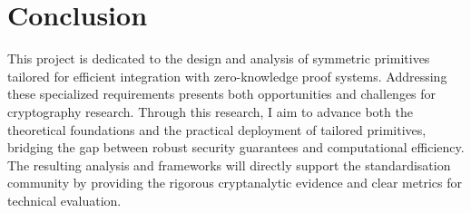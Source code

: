 	\section{Conclusion}
	This project is dedicated to the design and analysis of symmetric primitives tailored for efficient integration with zero-knowledge proof systems.
	Addressing these specialized requirements presents both opportunities and challenges for cryptography research.
	Through this research, I aim to advance both the theoretical foundations and the practical deployment of tailored primitives, bridging the gap between robust security guarantees and computational efficiency.
	The resulting analysis and frameworks will directly support the standardisation community by providing the rigorous cryptanalytic evidence and clear metrics for technical evaluation.
	
	
	
	\pagebreak
	
	
